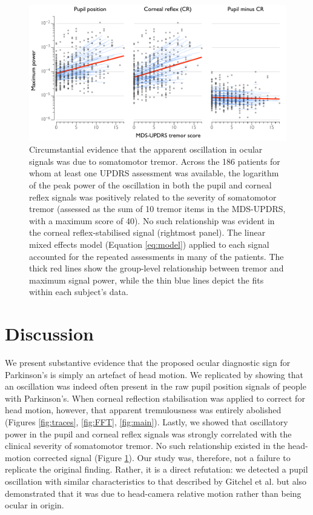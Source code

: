 \documentclass[jou,a4paper]{apa6}
\begin{document}
\begin{figure}[htbp]
\begin{center}
\includegraphics {Figures/Figure_5_UPDRS_correlation}
\caption{Circumstantial evidence that the apparent oscillation in ocular signals was due to somatomotor tremor. Across the 186 patients for whom at least one UPDRS assessment was available, the logarithm of the peak power of the oscillation in both the pupil and corneal reflex signals was positively related to the severity of somatomotor tremor (assessed as the sum of 10 tremor items in the MDS-UPDRS, with a maximum score of 40). No such relationship was evident in the corneal reflex-stabilised signal (rightmost panel). The linear mixed effects model (Equation \ref{eq:model}) applied to each signal accounted for the repeated assessments in many of the patients. The thick red lines show the group-level relationship between tremor and maximum signal power, while the thin blue lines depict the fits within each subject's data.
}
\label{fig:UPDRS}
\end{center}
\end{figure}

\section{Discussion}
We present substantive evidence that the proposed ocular diagnostic sign for Parkinson's is simply an artefact of head motion. We replicated \citet{Gitchel2012Pervasive-ocula} by showing that an oscillation was indeed often present in the raw pupil position signals of people with Parkinson's. When corneal reflection stabilisation was applied to correct for head motion, however, that apparent tremulousness was entirely abolished (Figures \ref{fig:traces}, \ref{fig:FFT}, \ref{fig:main}). Lastly, we showed that oscillatory power in the pupil and corneal reflex signals was strongly correlated with the clinical severity of somatomotor tremor. No such relationship existed in the head-motion corrected signal (Figure \ref{fig:UPDRS}). Our study was, therefore, not a failure to replicate the original finding. Rather, it is a direct refutation: we detected a pupil oscillation with similar characteristics to that described by Gitchel et al. but also demonstrated that it was due to head-camera relative motion rather than being ocular in origin.
\end{document}
